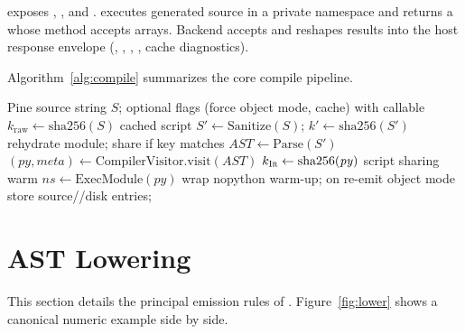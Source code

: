 \documentclass[11pt,a4paper]{article}
\begin{document}
 exposes , , and
.  executes generated source in a
private namespace and returns a  whose  method
accepts \ohlcv{} arrays. Backend  accepts
 and reshapes results into the
host response envelope (, , ,
, cache diagnostics).

Algorithm~\ref{alg:compile} summarizes the core compile pipeline.

\begin{algorithm}[t]
\caption{\textsc{CompileScript}(source, options)}
\label{alg:compile}
\begin{algorithmic}[1]
\Require Pine source string $S$; optional flags (force object mode, cache)
\Ensure {} with  callable
\State $k_{\mathrm{raw}} \gets \mathrm{sha256}(S)$
  \State \Return cached script 
\EndIf
\State $S' \gets \mathrm{Sanitize}(S)$; $k' \gets \mathrm{sha256}(S')$
  \State rehydrate module; share  if \ir{} key matches
  \State \Return {}
\EndIf
\State $\mathit{AST} \gets \mathrm{Parse}(S')$
\State $(\mathit{py}, \mathit{meta}) \gets \mathrm{CompilerVisitor.visit}(\mathit{AST})$
\State $k_{\textsc{Ir}{}} \gets \mathrm{sha256}(\mathit{py})$
  \State \Return script sharing warm 
\EndIf
\State $\mathit{ns} \gets \mathrm{ExecModule}(\mathit{py})$
\State wrap nopython warm-up; on  re-emit object mode
\State store source/\ir{}/disk entries; \Return {}
\end{algorithmic}
\end{algorithm}

\section{AST Lowering}
\label{sec:lowering}

This section details the principal emission rules of .
Figure~\ref{fig:lower} shows a canonical numeric example side by side.
\end{document}
